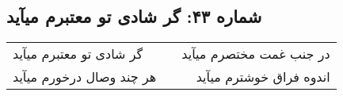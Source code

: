 \begin{center}
\section*{شماره ۴۳: گر شادی تو معتبرم میآید}
\label{sec:043}
\begin{longtable}{l p{0.5cm} r}
گر شادی تو معتبرم میآید
&&
در جنب غمت مختصرم میآید
\\
هر چند وصال درخورم میآید
&&
اندوه فراق خوشترم میآید
\\
\end{longtable}
\end{center}
